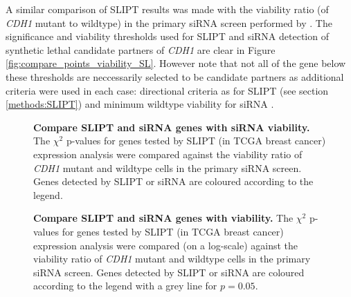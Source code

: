 A similar comparison of SLIPT results was made with the viability ratio (of \textit{CDH1} mutant to wildtype) in the primary siRNA screen performed by \citet{Telford2015}. The significance and viability thresholds used for SLIPT and siRNA detection of synthetic lethal candidate partners of \textit{CDH1} are clear in Figure \ref{fig:compare_points_viability_SL}. However note that not all of the gene below these thresholds are neccessarily selected to be candidate partners as additional criteria were used in each case: directional criteria as for SLIPT (see section \ref{methods:SLIPT}) and minimum wildtype viability for siRNA \citep{Telford2015}.

\begin{figure}[!htp]
\begin{mdframed}
\begin{center}
   \end{center}
   \caption[Compare SLIPT and siRNA genes with siRNA viability]{\small \textbf{Compare SLIPT and siRNA genes with siRNA viability.} The $\chi^2$ p-values for genes tested by SLIPT (in TCGA breast cancer) expression analysis were compared against the viability ratio of \textit{CDH1} mutant and wildtype cells in the primary siRNA screen. Genes detected by SLIPT or siRNA are coloured according to the legend. 
}
\label{fig:compare_points_viability_SL}
\end{mdframed}

\begin{mdframed}
\begin{center}
   \end{center}
   \caption[Compare SLIPT and siRNA genes with viability]{\small \textbf{Compare SLIPT and siRNA genes with viability.} The $\chi^2$ p-values for genes tested by SLIPT (in TCGA breast cancer) expression analysis were compared (on a log-scale) against the viability ratio of \textit{CDH1} mutant and wildtype cells in the primary siRNA screen. Genes detected by SLIPT or siRNA are coloured according to the legend with a grey line for $p=0.05$.
}
\label{fig:compare_pval_points_correlation_SL}
\end{mdframed}
\end{figure}

